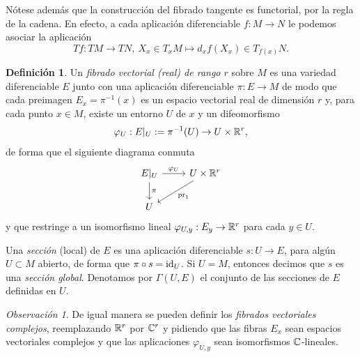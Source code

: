 \documentclass[11pt,a4paper]{amsbook}
\theoremstyle{remark} \newtheorem{rmk}[subsection]{Observación}
\theoremstyle{definition} \newtheorem{defn}[subsection]{Definición}
\theoremstyle{definition} \newtheorem{ex}[subsection]{Ejemplo}
\theoremstyle{definition} \newtheorem{ej}[subsection]{Ejercicio}
\begin{document}
Nótese además que la construcción del fibrado tangente es functorial, por la regla de la cadena. En efecto, a cada aplicación diferenciable $f:M\rightarrow N$ le podemos asociar la aplicación
\begin{equation*}
Tf: TM \rightarrow TN,\  X_x \in T_xM \mapsto d_xf(X_x) \in T_{f(x)}N.
\end{equation*}


\begin{defn}
  Un \emph{fibrado vectorial (real) de rango $r$} sobre $M$ es una variedad diferenciable $E$ junto con una aplicación diferenciable $\pi:E\rightarrow M$ de modo que cada preimagen $E_x=\pi^{-1}(x)$ es un espacio vectorial real de dimensión $r$ y, para cada punto $x\in M$, existe un entorno $U$ de $x$ y un difeomorfismo
  \begin{equation*}
\varphi_U: E|_U := \pi^{-1}(U) \rightarrow U \times \mathbb R^r,
  \end{equation*}
  de forma que el siguiente diagrama conmuta
  \begin{equation*}
      \begin{tikzcd}
        E|_U \rar{\varphi_U} \dar{\pi} & U \times \RR^r \ar{ld}{\mathrm{pr}_1} \\
        U &
      \end{tikzcd}
  \end{equation*}
y que restringe a un isomorfismo lineal $\varphi_{U,y}:E_y \rightarrow \mathbb R^r$ para cada $y \in U$.

Una \emph{sección} (local) de $E$ es una aplicación diferenciable $s:U\rightarrow E$, para algún $U\subset M$ abierto, de forma que $\pi\circ s = \mathrm{id}_U$. Si $U=M$, entonces decimos que $s$ es una \emph{sección global}. Denotamos por $\Gamma(U,E)$ el conjunto de las secciones de $E$ definidas en $U$.
\end{defn}

\begin{rmk}
De igual manera se pueden definir los \emph{fibrados vectoriales complejos}, reemplazando $\mathbb R^r$ por $\mathbb C^r$ y pidiendo que las fibras $E_x$ sean espacios vectoriales complejos y que las aplicaciones $\varphi_{U,y}$ sean isomorfismos $\mathbb C$-lineales.
\end{rmk}
\end{document}

